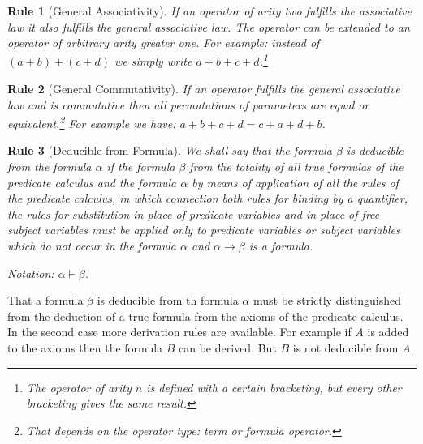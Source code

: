 \documentclass[a4paper,german,10pt,twoside]{book}
\newtheorem{rul}{Rule}
\theoremstyle{definition}
\theoremstyle{remark}
\begin{document}
\par


\begin{rul}[General Associativity]
\label{rule:generalAssociativity} \hypertarget{rule:generalAssociativity}{}
If an operator of arity two fulfills the associative law it also fulfills the general associative law. The operator can be extended to an operator of arbitrary arity greater one. For example: instead of $(a + b) + (c + d)$ we simply write $a + b + c + d$.\footnote{The operator of arity $n$ is defined with a certain bracketing, but every other bracketing gives the same result.}
\end{rul}




\par


\begin{rul}[General Commutativity]
\label{rule:generalCommutativity} \hypertarget{rule:generalCommutativity}{}
If an operator fulfills the general associative law and is commutative then all permutations of parameters are equal or equivalent.\footnote{That depends on the operator type: term or formula operator.} For example we have: $a + b + c + d  = c + a + d + b$.
\end{rul}




\par


\begin{rul}[Deducible from Formula]
\label{rule:definitionDeductionFromFormula} \hypertarget{rule:definitionDeductionFromFormula}{}
We shall say that the formula $\beta$ is \emph{deducible from the formula $\alpha$} if the formula $\beta$ from the totality of all true formulas of the predicate calculus and the formula $\alpha$ by means of application of all the rules of the predicate calculus, in which connection both rules for binding by a quantifier, the rules for substitution in place of predicate variables and in place of free subject variables must be applied only to predicate variables or subject variables which do not occur in the formula $\alpha$ and $\alpha \rightarrow \beta$ is a formula. 

\par
Notation: $\alpha \vdash \beta$.
\end{rul}

That a formula $\beta$ is deducible from th formula $\alpha$ must be strictly distinguished from the deduction of a true formula from the axioms of the predicate calculus. In the second case more derivation rules are available. For example if $A$ is added to the axioms then the formula $B$ can be derived. But $B$ is not deducible from $A$.
\end{document}
